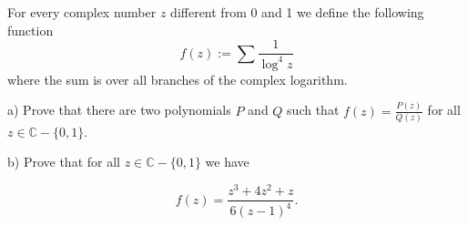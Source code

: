 For every complex number $z$ different from 0 and 1 we define the following function
\[  f(z) := \sum \frac 1 {  \log^4 z } \]
where the sum is over all branches of the complex logarithm.

a) Prove that there are two polynomials $P$ and $Q$ such that $f(z) = \displaystyle \frac {P(z)}{Q(z)} $ for all $z\in\mathbb{C}-\{0,1\}$.

b) Prove that for all $z\in \mathbb{C}-\{0,1\}$ we have

\[ f(z) = \frac { z^3+4z^2+z}{6(z-1)^4}. \]